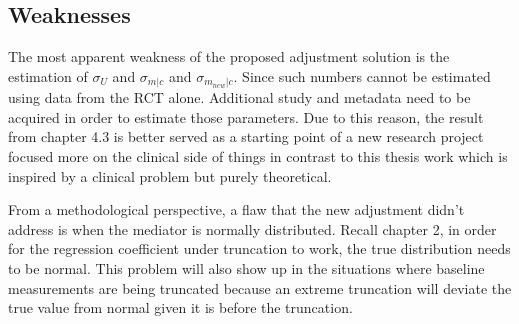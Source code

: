 \documentclass{article}
\begin{document}
\subsection{Weaknesses}

The most apparent weakness of the proposed adjustment solution is the estimation of $\sigma_U$ and  $\sigma_{m | c}$ and $\sigma_{m_{new}|c}$. Since such numbers cannot be estimated using data from the RCT alone. Additional study and metadata need to be acquired in order to estimate those parameters. Due to this reason, the result from chapter 4.3 is better served as a starting point of a new research project focused more on the clinical side of things in contrast to this thesis work which is inspired by a clinical problem but purely theoretical. 

From a methodological perspective, a flaw that the new adjustment didn’t address is when the mediator is normally distributed. Recall chapter 2, in order for the regression coefficient under truncation to work, the true distribution needs to be normal. This problem will also show up in the situations where baseline measurements are being truncated because an extreme truncation will deviate the true value from normal given it is before the truncation. 








\typeout{} 
\end{document}
